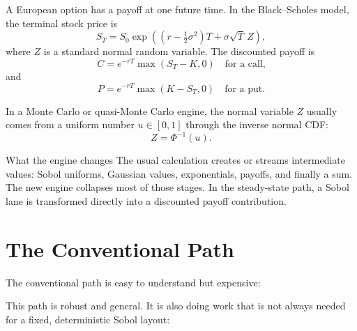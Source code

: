 \documentclass[11pt,a4paper]{article}
\newcommand{\normalcdf}{\Phi}
\begin{document}
A European option has a payoff at one future time. In the Black--Scholes model,
the terminal stock price is
\[
  S_T = S_0 \exp\left((r - \tfrac{1}{2}\sigma^2)T + \sigma\sqrt{T}\,Z\right),
\]
where \(Z\) is a standard normal random variable. The discounted payoff is
\[
  C = e^{-rT}\max(S_T-K,0)
  \quad\text{for a call,}
\]
and
\[
  P = e^{-rT}\max(K-S_T,0)
  \quad\text{for a put.}
\]

In a Monte Carlo or quasi-Monte Carlo engine, the normal variable \(Z\) usually
comes from a uniform number \(u\in[0,1]\) through the inverse normal CDF:
\[
  Z = \normalcdf^{-1}(u).
\]

\begin{keybox}{What the engine changes}
The usual calculation creates or streams intermediate values:
Sobol uniforms, Gaussian values, exponentials, payoffs, and finally a sum.
The new engine collapses most of those stages. In the steady-state path, a Sobol
lane is transformed directly into a discounted payoff contribution.
\end{keybox}

\section{The Conventional Path}

The conventional path is easy to understand but expensive:

\begin{center}
\end{center}

This path is robust and general. It is also doing work that is not always needed
for a fixed, deterministic Sobol layout:
\end{document}

